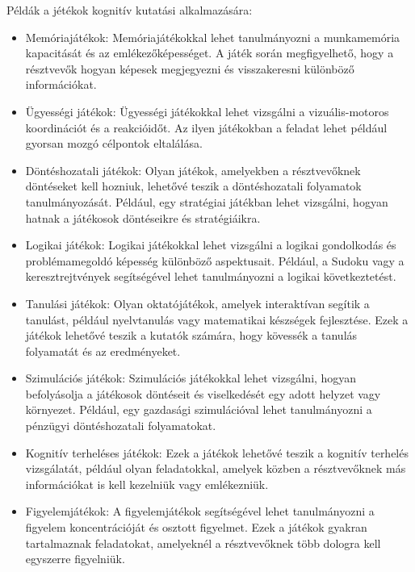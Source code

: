 Példák a jétékok kognitív kutatási alkalmazására:
\begin{itemize}
    
    \item Memóriajátékok: Memóriajátékokkal lehet tanulmányozni a munkamemória kapacitását és az emlékezőképességet. A játék során megfigyelhető, hogy a résztvevők hogyan képesek megjegyezni és visszakeresni különböző információkat.

    \item Ügyességi játékok: Ügyességi játékokkal lehet vizsgálni a vizuális-motoros koordinációt és a reakcióidőt. Az ilyen játékokban a feladat lehet például gyorsan mozgó célpontok eltalálása.
    
    \item Döntéshozatali játékok: Olyan játékok, amelyekben a résztvevőknek döntéseket kell hozniuk, lehetővé teszik a döntéshozatali folyamatok tanulmányozását. Például, egy stratégiai játékban lehet vizsgálni, hogyan hatnak a játékosok döntéseikre és stratégiáikra.
    
    \item Logikai játékok: Logikai játékokkal lehet vizsgálni a logikai gondolkodás és problémamegoldó képesség különböző aspektusait. Például, a Sudoku vagy a keresztrejtvények segítségével lehet tanulmányozni a logikai következtetést.
    
    \item Tanulási játékok: Olyan oktatójátékok, amelyek interaktívan segítik a tanulást, például nyelvtanulás vagy matematikai készségek fejlesztése. Ezek a játékok lehetővé teszik a kutatók számára, hogy kövessék a tanulás folyamatát és az eredményeket.
    
    \item Szimulációs játékok: Szimulációs játékokkal lehet vizsgálni, hogyan befolyásolja a játékosok döntéseit és viselkedését egy adott helyzet vagy környezet. Például, egy gazdasági szimulációval lehet tanulmányozni a pénzügyi döntéshozatali folyamatokat.
    
    \item Kognitív terheléses játékok: Ezek a játékok lehetővé teszik a kognitív terhelés vizsgálatát, például olyan feladatokkal, amelyek közben a résztvevőknek más információkat is kell kezelniük vagy emlékezniük.
    
    \item Figyelemjátékok: A figyelemjátékok segítségével lehet tanulmányozni a figyelem koncentrációját és osztott figyelmet. Ezek a játékok gyakran tartalmaznak feladatokat, amelyeknél a résztvevőknek több dologra kell egyszerre figyelniük.

\end{itemize}

